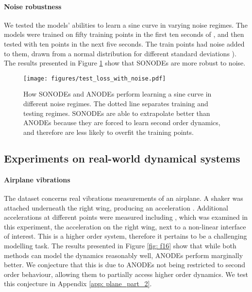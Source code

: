 \documentclass{article}
\theoremstyle{remark}
\theoremstyle{definition}
\begin{document}
\paragraph{Noise robustness} We tested the models' abilities to learn a sine curve in varying noise regimes. The models were trained on fifty training points in the first ten seconds of , and then tested with ten points in the next five seconds. The train points had noise added to them, drawn from a normal distribution  for different standard deviations ). The results presented in Figure \ref{fig: noise_robustness} show that SONODEs are more robust to noise. 

\begin{figure}[h]
    \centering
    \texttt{[image: figures/test\_loss\_with\_noise.pdf]}
    \vspace{-10pt}
    \caption{How SONODEs and ANODEs perform learning a sine curve in different noise regimes. The dotted line separates training and testing regimes. SONODEs are able to extrapolate better than ANODEs because they are forced to learn second order dynamics, and therefore are less likely to overfit the training points.}
    \label{fig: noise_robustness}
\end{figure}


\subsection{Experiments on real-world dynamical systems}
\label{sec: planes}

\paragraph{Airplane vibrations} The dataset \cite{noel2017f} concerns real vibrations measurements of an airplane. A shaker was attached underneath the right wing, producing an acceleration . Additional accelerations at different points were measured including , which was examined in this experiment, the acceleration on the right wing, next to a non-linear interface of interest. This is a higher order system, therefore it pertains to be a challenging modelling task. The results presented in Figure \ref{fig: f16} show that while both methods can model the dynamics reasonably well, ANODEs perform marginally better. We conjecture that this is due to ANODEs not being restricted to second order behaviour, allowing them to partially access higher order dynamics. We test this conjecture in Appendix \ref{app: plane_part_2}. 
\end{document}
